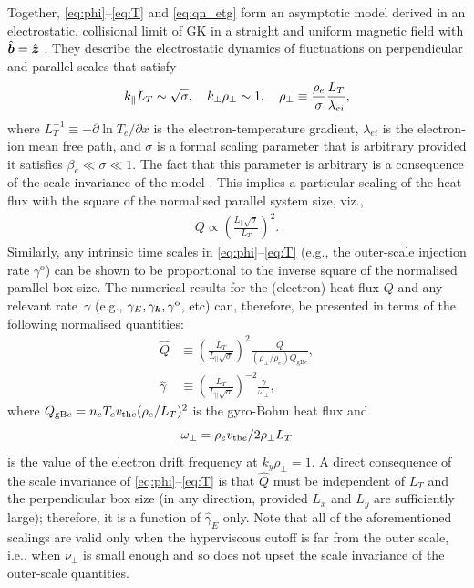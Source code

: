 \documentclass{jpp}
\newcommand{\gammao}{\gamma^\text{o}}
\newcommand{\gammaE}{\gamma_{E}}
\newcommand{\gammaEhat}{\hat{\gamma}_{E}}
\newcommand{\omegaperp}{\omega_\perp}
\begin{document}
Together, \cref{eq:phi}--\cref{eq:T} and \cref{eq:qn_etg} form an asymptotic model derived in an electrostatic, collisional limit of GK in a straight and uniform magnetic field with \(\hat{\boldsymbol{b}} = \hat{\boldsymbol{z}}\) \citep{adkins23}. They describe the electrostatic dynamics of fluctuations on perpendicular and parallel scales that satisfy
\begin{equation}
	k_\parallel L_T \sim \sqrt{\sigma}, \quad k_\perp \rho_\perp \sim 1, \quad \rho_\perp \equiv \frac{\rho_e}{\sigma} \frac{L_T}{\lambda_{ei}},
\end{equation}
where \(L_T^{-1} \equiv -\partial \ln T_{e}/\partial x\) is the electron-temperature gradient, \(\lambda_{ei}\) is the electron-ion mean free path, and \(\sigma\) is a formal scaling parameter that is arbitrary provided it satisfies \(\beta_e \ll \sigma \ll 1\). The fact that this parameter is arbitrary is a consequence of the scale invariance of the model \citep{adkins23}. This implies a particular scaling of the heat flux with the square of the normalised parallel system size, viz., 
\begin{align}
	Q \propto \left(\frac{L_\parallel \sqrt{\sigma	}}{L_T}\right)^2.
	\label{eq:heatflux_lpar2}
\end{align}
Similarly, any intrinsic time scales in \cref{eq:phi}--\cref{eq:T} (e.g., the outer-scale injection rate \(\gammao\)) can be shown to be proportional to the inverse square of the normalised parallel box size. The numerical results for the (electron) heat flux \(Q\) and any relevant rate~\(\gamma\) (e.g., \(\gammaE, \gamma_\vk, \gammao\), etc) can, therefore, be presented in terms of the following normalised quantities:
\begin{align}
	\hat{Q} &\equiv \left(\frac{L_T}{L_\parallel \sqrt{\sigma}} \right)^2 \frac{Q}{(\rho_\perp/\rho_e) Q_{\text{gB}e}}, \label{eq:qnorm} \\
	\hat{\gamma} & \equiv \left(\frac{L_T}{L_\parallel \sqrt{\sigma}} \right)^{-2}  \frac{\gamma}{\omegaperp},
	\label{eq:gammanorm}
\end{align}
where \mbox{\(Q_{\text{gB}e} = n_{e} T_{e} v_{\text{th}e} (\rho_e/L_T)^2\)} is the gyro-Bohm heat flux and 
\begin{equation}
	\omegaperp = \rhoe \vthe / 2\rho_\perp L_T
	\label{eq:omegaperp_def}
\end{equation}
is the value of the electron drift frequency at $k_y \rho_\perp = 1$. A direct consequence of the scale invariance of \cref{eq:phi}--\cref{eq:T} is that \(\hat{Q}\) must be independent of \(L_T\) and the perpendicular box size (in any direction, provided \(L_x\) and \(L_y\) are sufficiently large); therefore, it is a function of \(\gammaEhat\) only. Note that all of the aforementioned scalings are valid only when the hyperviscous cutoff is far from the outer scale, i.e., when \(\nu_\perp\) is small enough and so does not upset the scale invariance of the outer-scale quantities.
\end{document}
